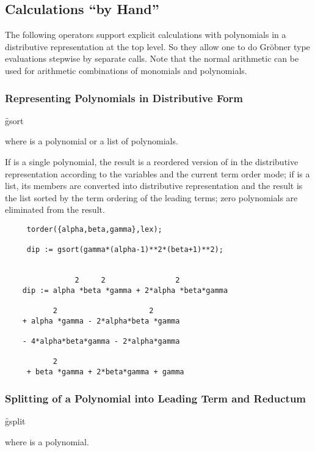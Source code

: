 \subsection{Calculations ``by Hand''}
The following operators support explicit calculations with
polynomials in a distributive representation at the \REDUCE top level.
So they allow one to do Gr\"obner type evaluations stepwise by
separate calls. Note that the normal \REDUCE arithmetic can be used
for arithmetic combinations of monomials and polynomials.

\subsubsection{Representing Polynomials in Distributive Form}
\hypertarget{operator:GSORT}{}
\begin{syntax}
  \f{gsort }
\end{syntax}
where  is a polynomial or a list of polynomials.

If  is a single polynomial, the result is a reordered version of 
in the distributive representation according to the variables and the
current term order mode; if  is a list, its members are converted
into distributive representation and the result is the list sorted by
the term ordering of the leading terms; zero polynomials are
eliminated from the result.

\begin{verbatim}
     torder({alpha,beta,gamma},lex);

     dip := gsort(gamma*(alpha-1)**2*(beta+1)**2);


                2     2                2
    dip := alpha *beta *gamma + 2*alpha *beta*gamma

           2                     2
    + alpha *gamma - 2*alpha*beta *gamma

    - 4*alpha*beta*gamma - 2*alpha*gamma

           2
     + beta *gamma + 2*beta*gamma + gamma
\end{verbatim}

\subsubsection{Splitting of a Polynomial into Leading Term and Reductum}
\hypertarget{operator:GSPLIT}{}
\begin{syntax}
  \f{gsplit }
\end{syntax}
where  is a polynomial.

